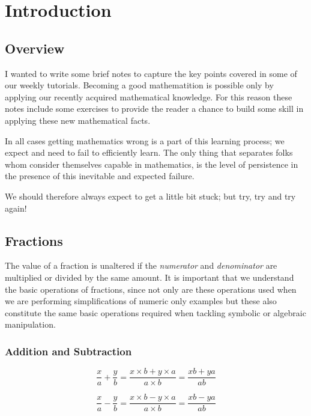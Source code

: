 \chapter{Introduction}
\label{ch:intro}

\section{Overview}

I wanted to write some brief notes to capture the key points covered in some of our weekly tutorials. Becoming a good mathematition is possible only by applying our recently acquired mathematical knowledge. For this reason these notes include some exercises to provide the reader a chance to build some skill in applying these new mathematical facts. 

In all cases getting mathematics wrong is a part of this learning process; we expect and need to fail to efficiently learn. The only thing that separates folks whom consider themselves capable in mathematics, is the level of persistence in the presence of this inevitable and expected failure. 

We should therefore always expect to get a little bit stuck; but try, try and try again!

\section{Fractions}

The value of a fraction is unaltered if the \textit{numerator} and \textit{denominator} are multiplied or divided by the same amount. It is important that we understand the basic operations of fractions, since not only are these operations used when we are performing simplifications of numeric only examples but these also constitute the same basic operations required when tackling symbolic or algebraic manipulation.

\subsection{Addition and Subtraction}

\begin{equation}
 \frac{x}{a} + \frac{y}{b} = \frac{x \times b + y \times a}{a \times b} = \frac{xb + ya}{ab}
\end{equation}

\begin{equation}
 \frac{x}{a} - \frac{y}{b} = \frac{x \times b - y \times a}{a \times b} = \frac{xb - ya}{ab}
\end{equation}

